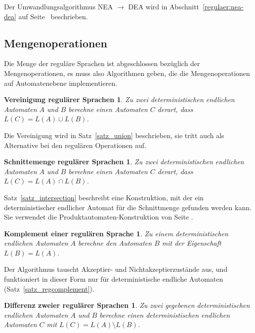 Der Umwandlungsalgorithmus NEA $\to$ DEA wird in
Abschnitt~\ref{regulaer:nea-dea}
auf
Seite~\pageref{regulaer:nea-dea}
beschrieben.

\subsection{Mengenoperationen}
Die Menge der reguläre Sprachen ist abgeschlossen bezüglich der
Mengenoperationen, es muss also Algorithmen geben, die die Mengenoperationen
auf Automatenebene implementieren.

\newtheorem*{RegVereinigung}{Vereinigung regulärer Sprachen}
\begin{RegVereinigung}
Zu zwei deterministischen endlichen Automaten $A$ und $B$ berechne einen
Automaten $C$ derart, dass $L(C)=L(A)\cup L(B)$.
\end{RegVereinigung}

Die Vereinigung wird in Satz~\ref{satz_union} beschrieben, sie tritt auch als
Alternative bei den regulären Operationen auf.

\newtheorem*{RegSchnitt}{Schnittemenge regulärer Sprachen}
\begin{RegSchnitt}
Zu zwei deterministischen endlichen Automaten $A$ und $B$ berechne einen
Automaten $C$ derart, dass $L(C)=L(A)\cap L(B)$.
\end{RegSchnitt}

Satz~\ref{satz_intersection} beschreibt eine Konstruktion, mit der
ein deterministischer endlicher Automat für die Schnittmenge gefunden
werden kann.
Sie verwendet die Produktautomaten-Konstruktion von Seite
\pageref{reg_produktautomat}.

\newtheorem*{RegNegation}{Komplement einer regulären Sprache}
\begin{RegNegation}
Zu einem deterministischen endlichen Automaten $A$ berechne den Automaten
$B$ mit der Eigenschaft $L(B)=\overline{L(A)}$.
\end{RegNegation}

Der Algorithmus tauscht Akzeptier- und Nichtakzeptierzustände aus,
und funktioniert in dieser Form nur für deterministische endliche
Automaten (Satz~\ref{satz_regcomplement}).

\newtheorem*{RegDifferenz}{Differenz zweier regulärer Sprachen}
\begin{RegDifferenz}
Zu zwei gegebenen deterministischen endlichen Automaten $A$ und $B$ 
berechne einen deterministischen endlichen Automaten $C$ mit
$L(C)=L(A)\setminus L(B)$.
\end{RegDifferenz}

